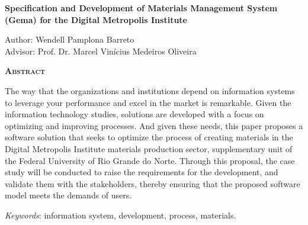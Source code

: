 \begin{center}
	{\Large{\textbf{Specification and Development of Materials Management System (Gema) for the Digital Metropolis Institute}}}
\end{center}

\vspace{1cm}

\begin{flushright}
	Author: Wendell Pamplona Barreto\\
	Advisor: Prof. Dr. Marcel Vinícius Medeiros Oliveira
\end{flushright}

\vspace{1cm}

\begin{center}
	\Large{\textsc{\textbf{Abstract}}}
\end{center}

\noindent The way that the organizations and institutions depend on information systems to leverage your performance and excel in the market is remarkable. Given the information technology studies, solutions are developed with a focus on optimizing and improving processes. And given these needs, this paper proposes a software solution that seeks to optimize the process of creating materials in the Digital Metropolis Institute materials production sector, supplementary unit of the Federal University of Rio Grande do Norte. Through this proposal, the case study will be conducted to raise the requirements for the development, and validate them with the stakeholders, thereby ensuring that the proposed software model meets the demands of users.

\noindent\textit{Keywords}: information system, development, process, materials.
